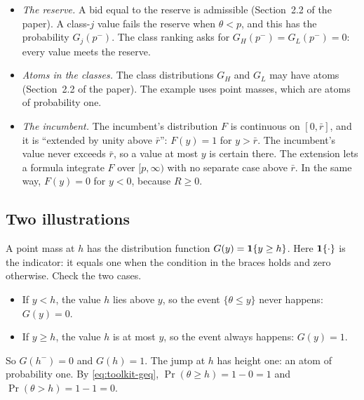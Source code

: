 \begin{itemize}
\item \emph{The reserve.} A bid equal to the reserve is admissible (Section~2.2 of the paper). A class-\(j\) value
fails the reserve when \(\theta<p\), and this has the probability \(G_j(p^-)\). The class ranking asks for
\(G_H(p^-)=G_L(p^-)=0\): every value meets the reserve.
\item \emph{Atoms in the classes.} The class distributions \(G_H\) and \(G_L\) may have atoms (Section~2.2 of the
paper). The example uses point masses, which are atoms of probability one.
\item \emph{The incumbent.} The incumbent's distribution \(F\) is continuous on \([0,\bar r]\), and it is
``extended by unity above \(\bar r\)'': \(F(y)=1\) for \(y>\bar r\). The incumbent's value never exceeds \(\bar r\),
so a value at most \(y\) is certain there. The extension lets a formula integrate \(F\) over \([p,\infty)\) with no
separate case above \(\bar r\). In the same way, \(F(y)=0\) for \(y<0\), because \(R\ge0\).
\end{itemize}

\subsection{Two illustrations}

A point mass at \(h\) has the distribution function \(G(y)=\mathbf{1}\{y\ge h\}\). Here \(\mathbf{1}\{\cdot\}\) is the
indicator: it equals one when the condition in the braces holds and zero otherwise. Check the two cases.
\begin{itemize}
\item If \(y<h\), the value \(h\) lies above \(y\), so the event \(\{\theta\le y\}\) never happens: \(G(y)=0\).
\item If \(y\ge h\), the value \(h\) is at most \(y\), so the event always happens: \(G(y)=1\).
\end{itemize}
So \(G(h^-)=0\) and \(G(h)=1\). The jump at \(h\) has height one: an atom of probability one. By
\eqref{eq:toolkit-geq}, \(\Pr(\theta\ge h)=1-0=1\) and \(\Pr(\theta>h)=1-1=0\).

